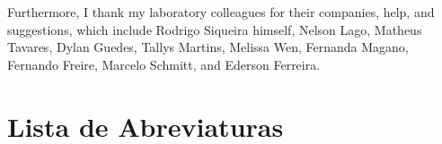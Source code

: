 Furthermore, I thank my laboratory colleagues for their companies, help, and
suggestions, which include Rodrigo Siqueira himself, Nelson Lago, Matheus
Tavares, Dylan Guedes, Tallys Martins, Melissa Wen, Fernanda Magano, Fernando
Freire, Marcelo Schmitt, and Ederson Ferreira.

\printResumoAbstract



\makeatletter
\if@openright\cleardoublepage\else\clearpage\fi
\makeatother


\newcommand\disablenewpage[1]{{\let\clearpage\par\let\cleardoublepage\par #1}}

\bgroup
\raggedbottom


\disablenewpage{\chapter*{Lista de Abreviaturas}}

